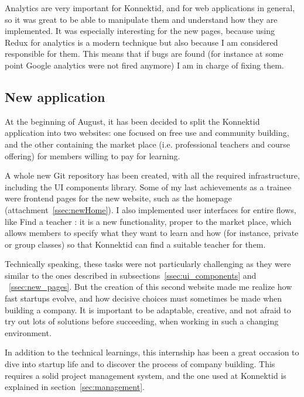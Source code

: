 Analytics are very important for Konnektid, and for web applications in general, so it was great to be able to manipulate them and understand how they are implemented. It was especially interesting for the new pages, because using Redux for analytics is a modern technique but also because I am considered responsible for them. This means that if bugs are found (for instance at some point Google analytics were not fired anymore) I am in charge of fixing them.

\subsection{New application}
\label{ssec:newApp}

At the beginning of August, it has been decided to split the Konnektid application into two websites: one focused on free use and community building, and the other containing the market place (i.e. professional teachers and course offering) for members willing to pay for learning. 

A whole new Git repository has been created, with all the required infrastructure, including the UI components library. Some of my last achievements as a trainee were frontend pages for the new website, such as the homepage ({\sc attachment}~\ref{ssec:newHome}). I also implemented user interfaces for entire flows, like \guillemotleft{} Find a teacher \guillemotright{}: it is a new functionality, proper to the market place, which allows members to specify what they want to learn and how (for instance, private or group classes) so that Konnektid can find a suitable teacher for them.

Technically speaking, these tasks were not particularly challenging as they were similar to the ones described in {\sc subsections}~\ref{ssec:ui_components} and ~\ref{ssec:new_pages}. But the creation of this second website made me realize how fast startups evolve, and how decisive choices must sometimes be made when building a company. It is important to be adaptable, creative, and not afraid to try out lots of solutions before succeeding, when working in such a changing environment.

In addition to the technical learnings, this internship has been a great occasion to dive into startup life and to discover the process of company building. This requires a solid project management system, and the one used at Konnektid is explained in {\sc section}~\ref{sec:management}.